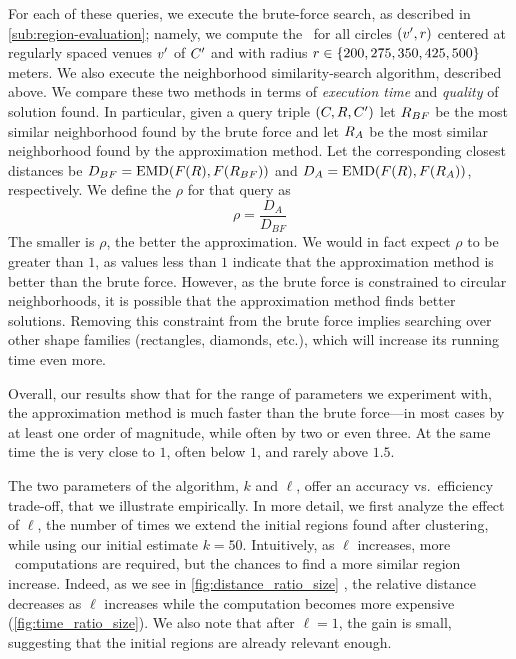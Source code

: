 For each of these queries, we execute the brute-force search, as
described in \autoref{sub:region-evaluation}; namely, 
we compute the \emd\ for all circles $({v}',{r})$ centered at
regularly spaced venues ${v}'$ of ${C}'$ and with radius ${r}\in\{200,
\allowbreak 275, \allowbreak 350, \allowbreak 425, \allowbreak 500\}$ meters.
We also execute the neighborhood similarity-search algorithm,
described above. 
We compare these two methods in terms of \emph{execution time} and
\emph{quality} of solution found. 
In particular, given a query  triple $({C}, {R}, {C}')$
let ${R}_{{BF}}$ be the most similar neighborhood found by
the brute force and 
let ${R}_{{A}}$ be the most similar neighborhood found by
the approximation method. 
Let the corresponding closest distances be
$D_{{BF}} = \mathrm{{EMD}}({F}({R}),{F}({R}_{{BF}}))$
and 
$D_{{A}} = \mathrm{{EMD}}({F}({R}),{F}({R}_{{A}}))$, 
respectively.
We  define the \emph{\Dratio{}} $\rho$ for that query
as  
\begin{equation*}
\rho = \frac{D_{{A}}}{ D_{{BF}} }
\end{equation*}
The smaller is $\rho$, the better the approximation.
We would in fact expect $\rho$ to be greater than $1$, as values less
than $1$ indicate that the approximation method is better than the brute
force.
However, as the brute force is constrained to circular neighborhoods,
it is possible that the approximation method finds better solutions.
Removing this constraint from the brute force implies searching
over other shape families (rectangles, diamonds, etc.), which will
increase its running time even more.

\medskip

Overall, our results show that for the range of parameters we
experiment with, the approximation method is much faster than the brute
force---in most cases by at least one order of magnitude, while
often by two or even three.
At the same time the \Dratio{} is very close to $1$, often below $1$,
and rarely above $1.5$.

The two parameters of the algorithm, $k$ and $\ell$, offer an accuracy vs.\
efficiency trade-off, that we illustrate empirically.
In more detail, we first analyze the effect of $\ell$, the number of times we
extend the initial regions found after clustering, while using our initial
estimate $k=50$. 
Intuitively, as $\ell$ increases, more \emd\ computations are required, but the
chances to find a more similar region increase. Indeed, as we see in
\autoref{fig:distance_ratio_size} \vpageref{fig:distance_ratio_size}, 
the relative distance decreases as $\ell$ increases while the
computation becomes more expensive (\autoref{fig:time_ratio_size}). 
We also note that after $\ell=1$, the gain is small, suggesting that
the initial regions are already relevant enough.

